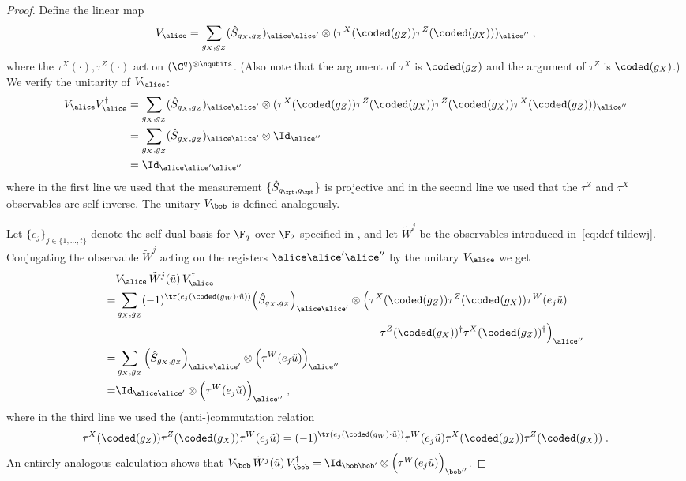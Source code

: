 \begin{proof}

Define the linear map
\[
	V_\alice = \sum_{g_X,g_Z} (\hat{S}_{g_X,g_Z})_{\alice \alice'} \otimes (\tau^X(\coded(g_Z)) \tau^Z(\coded(g_X)))_{\alice ''}\;,
\]
where the $\tau^X(\cdot),\tau^Z(\cdot)$ act on $(\C^q)^{\otimes \nqubits}$. (Also note that the argument of $\tau^X$ is $\coded(g_Z)$ and the argument of $\tau^Z$ is $\coded(g_X)$.) We verify the unitarity of $V_\alice$:
\begin{align*}
	V_\alice V_\alice^\dagger &= \sum_{g_X,g_Z} (\hat{S}_{g_X,g_Z})_{\alice \alice'} \otimes (\tau^X(\coded(g_Z)) \tau^Z(\coded(g_X)) \tau^Z(\coded(g_X)) \tau^X(\coded(g_Z)) )_{\alice ''} \\
	&= \sum_{g_X,g_Z} (\hat{S}_{g_X,g_Z})_{\alice \alice'} \otimes \Id_{\alice ''} \\
	&= \Id_{\alice \alice' \alice''}
\end{align*}
where in the first line we used that the measurement $\{ \hat{S}_{g_\xpt,g_\zpt} \}$  is projective and in the second line we used that the $\tau^Z$ and $\tau^X$ observables are self-inverse. The unitary $V_\bob$ is defined analogously.

Let $\{e_j\}_{j \in \{1,\ldots,t\}}$ denote the self-dual basis for $\F_q$ over $\F_2$ specified in , and let $\tilde{W}^j$ be the observables introduced in~\eqref{eq:def-tildewj}. Conjugating the observable $\tilde{W}^j$ acting on the registers $\alice \alice' \alice''$ by the unitary $V_\alice$ we get
\begin{align*}
	&V_\alice \, \tilde{W}^j(\tilde{u}) \, V_\alice^\dagger \\
  =& \sum_{g_X, g_Z} (-1)^{\tr( e_j(\coded(g_W) \cdot \tilde{u}))} \Big( \hat{S}_{g_X,g_Z}  \Big)_{\alice \alice'} \otimes \Big ( \tau^X(\coded(g_Z)) \tau^Z(\coded(g_X)) \tau^W(e_j \tilde{u}) \\
  &\hspace{24em}\tau^Z(\coded(g_X))^\dagger \tau^X(\coded(g_Z))^\dagger \Big)_{\alice ''} \\
	 =& \sum_{g_X, g_Z} \Big( \hat{S}_{g_X,g_Z}  \Big)_{\alice \alice'} \otimes \Big ( \tau^W(e_j \tilde{u}) \Big)_{\alice ''} \\
	 =& \Id_{\alice \alice'} \otimes \Big( \tau^W(e_j \tilde{u}) \Big)_{\alice ''}\;,
\end{align*}
where in the third line we used the (anti-)commutation relation
\[
	\tau^X(\coded(g_Z)) \tau^Z(\coded(g_X)) \tau^W(e_j \tilde{u}) = (-1)^{\tr( e_j(\coded(g_W) \cdot \tilde{u}))} \tau^W(e_j \tilde{u}) \tau^X(\coded(g_Z)) \tau^Z(\coded(g_X)) \;.
\]
An entirely analogous calculation shows that $V_\bob \, \tilde{W}^j(\tilde{u}) \, V_\bob^\dagger = \Id_{\bob \bob'} \otimes \Big( \tau^W(e_j \tilde{u}) \Big)_{\bob ''}$.


\end{proof}

